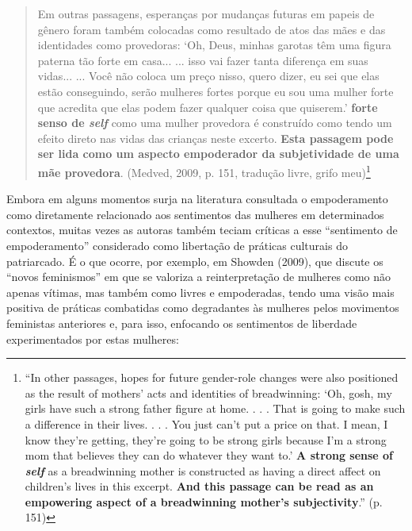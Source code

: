 \begin{quote}
    Em outras passagens, esperanças por mudanças futuras em papeis de gênero foram também colocadas como resultado de atos das mães e das identidades como provedoras: ‘Oh, Deus, minhas garotas têm uma figura paterna tão forte em casa... ... isso vai fazer tanta diferença em suas vidas... ... Você não coloca um preço nisso, quero dizer, eu sei que elas estão conseguindo, serão mulheres fortes porque eu sou uma mulher forte que acredita que elas podem fazer qualquer coisa que quiserem.’ \textbf{forte senso de \textit{self}} como uma mulher provedora é construído como tendo um efeito direto nas vidas das crianças neste excerto. \textbf{Esta passagem pode ser lida como um aspecto empoderador da subjetividade de uma mãe provedora}. (Medved, 2009, p. 151, tradução livre, grifo meu)\footnote{``In other passages, hopes for future gender-role changes were also positioned as the result of mothers’ acts and identities of breadwinning: ‘Oh, gosh, my girls have such a strong father figure at home. . . . That is going to make such a difference in their lives. . . . You just can’t put a price on that. I mean, I know they’re getting, they’re going to be strong girls because I’m a strong mom that believes they can do whatever they want to.’ \textbf{A strong sense of \textit{self}} as a breadwinning mother is constructed as having a direct affect on children’s lives in this excerpt. \textbf{And this passage can be read as an empowering aspect of a breadwinning mother’s subjectivity}.'' (p. 151)}
\end{quote}

Embora em alguns momentos surja na literatura consultada o empoderamento como diretamente relacionado aos sentimentos das mulheres em determinados contextos, muitas vezes as autoras também teciam críticas a esse ``sentimento de empoderamento'' considerado como libertação de práticas culturais do patriarcado. É o que ocorre, por exemplo, em Showden (2009), que discute os ``novos feminismos'' em que se valoriza a reinterpretação de mulheres como não apenas vítimas, mas também como livres e empoderadas, tendo uma visão mais positiva de práticas combatidas como degradantes às mulheres pelos movimentos feministas anteriores e, para isso, enfocando os sentimentos de liberdade experimentados por estas mulheres:

